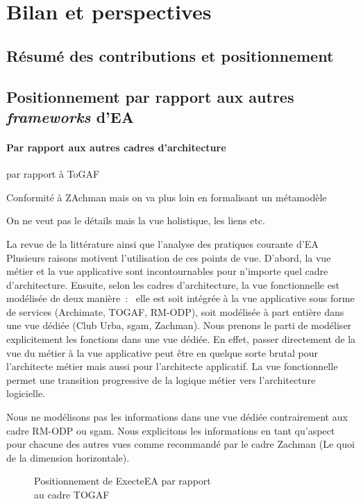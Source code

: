 \chapter{Bilan et perspectives}
\label{ch:bilan}

\PartialToc

\section{Résumé des contributions et positionnement}


\section{Positionnement par rapport aux autres \emph{frameworks} d'EA}

\subsubsection{Par rapport aux autres cadres d'architecture}
par rapport à ToGAF

Conformité à ZAchman mais on va plus loin en formalisant un métamodèle

On ne veut pas le détails mais la vue holistique, les liens etc.

La revue de la littérature ainsi que
l'analyse des pratiques courante d'EA Plusieurs raisons
motivent l'utilisation de ces points de vue. D'abord, la vue métier et la vue
applicative sont incontournables pour n'importe quel cadre d'architecture.
Ensuite, selon les cadres d'architecture, la vue fonctionnelle est modélisée de
deux manière~:~ elle est soit intégrée à la vue applicative sous forme de
services (Archimate, TOGAF, RM-ODP), soit modélisée à part entière dans une vue
dédiée (Club Urba, \gls{sgam}, Zachman). Nous prenons le parti de modéliser
explicitement les fonctions dans une vue dédiée. En effet, passer directement
de la vue du métier à la vue applicative peut être en quelque sorte brutal pour
l'architecte métier mais aussi pour l'architecte applicatif. La vue fonctionnelle
permet une transition progressive de la logique métier vers l'architecture
logicielle.

Nous ne modélisons pas les informations dans une vue dédiée contrairement aux
cadre RM-ODP ou \gls{sgam}. Nous explicitons les informations en tant qu'aspect
pour chacune des autres vues comme recommandé par le cadre Zachman (Le quoi de
la dimension horizontale).


\begin{figure}[!ht]
    \begin{center}
	
    \end{center}
	\caption{Positionnement de ExecteEA par rapport\\ au cadre TOGAF}
	\label{fig:positionTogaf}
\end{figure}

